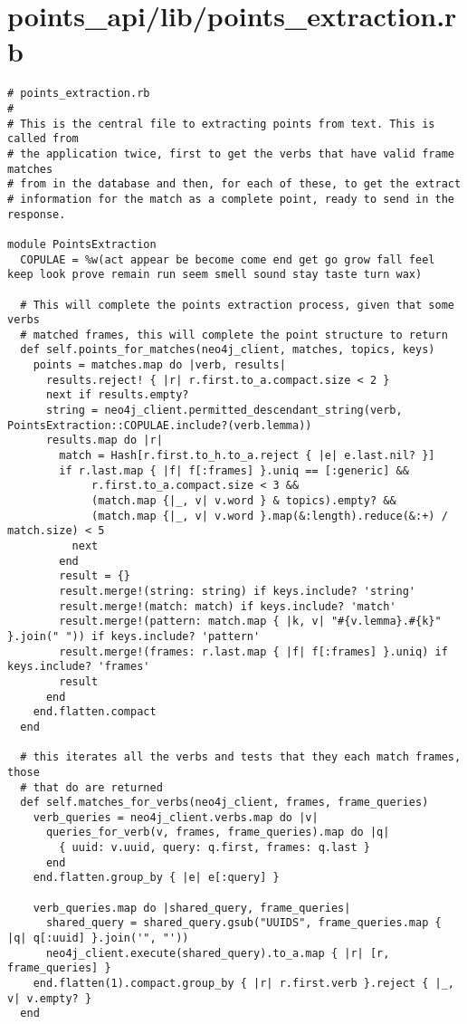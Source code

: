 \documentclass{article}
\begin{document}
\section*{points\_api/lib/points\_extraction.rb}
\begin{verbatim}
# points_extraction.rb
#
# This is the central file to extracting points from text. This is called from
# the application twice, first to get the verbs that have valid frame matches
# from in the database and then, for each of these, to get the extract
# information for the match as a complete point, ready to send in the response.

module PointsExtraction
  COPULAE = %w(act appear be become come end get go grow fall feel keep look prove remain run seem smell sound stay taste turn wax)

  # This will complete the points extraction process, given that some verbs
  # matched frames, this will complete the point structure to return
  def self.points_for_matches(neo4j_client, matches, topics, keys)
    points = matches.map do |verb, results|
      results.reject! { |r| r.first.to_a.compact.size < 2 }
      next if results.empty?
      string = neo4j_client.permitted_descendant_string(verb, PointsExtraction::COPULAE.include?(verb.lemma))
      results.map do |r|
        match = Hash[r.first.to_h.to_a.reject { |e| e.last.nil? }]
        if r.last.map { |f| f[:frames] }.uniq == [:generic] &&
             r.first.to_a.compact.size < 3 &&
             (match.map {|_, v| v.word } & topics).empty? &&
             (match.map {|_, v| v.word }.map(&:length).reduce(&:+) / match.size) < 5
          next
        end
        result = {}
        result.merge!(string: string) if keys.include? 'string'
        result.merge!(match: match) if keys.include? 'match'
        result.merge!(pattern: match.map { |k, v| "#{v.lemma}.#{k}" }.join(" ")) if keys.include? 'pattern'
        result.merge!(frames: r.last.map { |f| f[:frames] }.uniq) if keys.include? 'frames'
        result
      end
    end.flatten.compact
  end

  # this iterates all the verbs and tests that they each match frames, those
  # that do are returned
  def self.matches_for_verbs(neo4j_client, frames, frame_queries)
    verb_queries = neo4j_client.verbs.map do |v|
      queries_for_verb(v, frames, frame_queries).map do |q|
        { uuid: v.uuid, query: q.first, frames: q.last }
      end
    end.flatten.group_by { |e| e[:query] }

    verb_queries.map do |shared_query, frame_queries|
      shared_query = shared_query.gsub("UUIDS", frame_queries.map { |q| q[:uuid] }.join('", "'))
      neo4j_client.execute(shared_query).to_a.map { |r| [r, frame_queries] }
    end.flatten(1).compact.group_by { |r| r.first.verb }.reject { |_, v| v.empty? }
  end


\end{verbatim}
\end{document}

